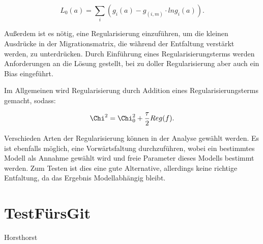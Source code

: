 \begin{equation}
 L_0(a)=\sum_i (g_i(a)-g_(i,m)\cdot ln g_i(a)).
\end{equation}

Außerdem ist es nötig, eine Regularisierung einzuführen, um die kleinen Ausdrücke in der Migrationsmatrix, die während der Entfaltung verstärkt werden, zu unterdrücken.
Durch Einführung eines Regularisierungsterms werden Anforderungen an die Lösung gestellt, bei zu doller Regularisierung aber auch ein Bias eingeführt.

Im Allgemeinen wird Regularisierung durch Addition eines Regularisierungsterms gemacht, sodass:

\begin{equation}
 \Chi^2=\Chi_0^2 +\frac{\tau}{2} Reg(f).
\end{equation}

Verschieden Arten der Regularisierung können in der Analyse gewählt werden.
Es ist ebenfalls möglich, eine Vorwärtsfaltung durchzuführen, wobei ein bestimmtes Modell als Annahme gewählt wird und freie Parameter dieses Modells bestimmt werden.
Zum Testen ist dies eine gute Alternative, allerdings keine richtige Entfaltung, da das Ergebnis Modellabhängig bleibt.

\section{TestFürsGit}

Horsthorst

